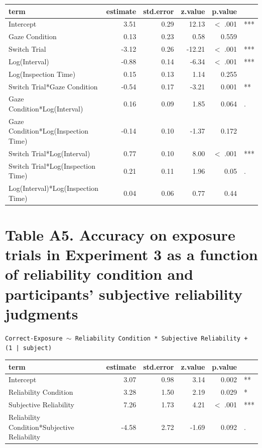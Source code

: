\documentclass[authoryear, review]{elsarticle}
\begin{document}
\begin{table}[h]
\centering
\begin{tabular}{lrrrrl}
 term & estimate & std.error & z.value & p.value &  \\ 
  \hline
Intercept & 3.51 & 0.29 & 12.13 & $<$ .001 & *** \\ 
  Gaze Condition & 0.13 & 0.23 & 0.58 & 0.559 &  \\ 
  Switch Trial & -3.12 & 0.26 & -12.21 & $<$ .001 & *** \\ 
  Log(Interval) & -0.88 & 0.14 & -6.34 & $<$ .001 & *** \\ 
  Log(Inspection Time) & 0.15 & 0.13 & 1.14 & 0.255 &  \\ 
  Switch Trial*Gaze Condition & -0.54 & 0.17 & -3.21 & 0.001 & ** \\ 
  Gaze Condition*Log(Interval) & 0.16 & 0.09 & 1.85 & 0.064 & . \\ 
  Gaze Condition*Log(Inspection Time) & -0.14 & 0.10 & -1.37 & 0.172 &  \\ 
  Switch Trial*Log(Interval) & 0.77 & 0.10 & 8.00 & $<$ .001 & *** \\ 
  Switch Trial*Log(Inspection Time) & 0.21 & 0.11 & 1.96 & 0.05 & . \\ 
  Log(Interval)*Log(Inspection Time) & 0.04 & 0.06 & 0.77 & 0.44 &  \\ 
   \hline
\end{tabular}
\label{tab:e2_acc_it}
\end{table}

\newpage

\section*{Table A5. Accuracy on exposure trials in Experiment 3 as a function of reliability condition and participants' subjective reliability judgments}

\texttt{Correct-Exposure $\sim$ Reliability Condition * Subjective Reliability + (1 | subject)}

\begin{table}[h]
\centering
\begin{tabular}{lrrrrl}
 term & estimate & std.error & z.value & p.value &  \\ 
  \hline
Intercept & 3.07 & 0.98 & 3.14 & 0.002 & ** \\ 
  Reliability Condition & 3.28 & 1.50 & 2.19 & 0.029 & * \\ 
  Subjective Reliability & 7.26 & 1.73 & 4.21 & $<$ .001 & *** \\ 
  Reliability Condition*Subjective Reliability & -4.58 & 2.72 & -1.69 & 0.092 & . \\ 
   \hline
\end{tabular}
\label{tab:e3_gf_exp}
\end{table}
\end{document}
